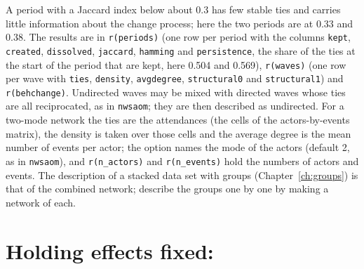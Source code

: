 A period with a Jaccard index below about 0.3 has few stable ties and carries little information about the change process; here the two periods are at 0.33 and 0.38. The results are in \texttt{r(periods)} (one row per period with the columns \texttt{kept}, \texttt{created}, \texttt{dissolved}, \texttt{jaccard}, \texttt{hamming} and \texttt{persistence}, the share of the ties at the start of the period that are kept, here 0.504 and 0.569), \texttt{r(waves)} (one row per wave with \texttt{ties}, \texttt{density}, \texttt{avgdegree}, \texttt{structural0} and \texttt{structural1}) and \texttt{r(behchange)}. Undirected waves may be mixed with directed waves whose ties are all reciprocated, as in \texttt{nwsaom}; they are then described as undirected. For a two-mode network the ties are the attendances (the cells of the actors-by-events matrix), the density is taken over those cells and the average degree is the mean number of events per actor; the option  names the mode of the actors (default 2, as in \texttt{nwsaom}), and \texttt{r(n\_actors)} and \texttt{r(n\_events)} hold the numbers of actors and events. The description of a stacked data set with groups (Chapter~\ref{ch:groups}) is that of the combined network; describe the groups one by one by making a network of each.

\section{Holding effects fixed: }

